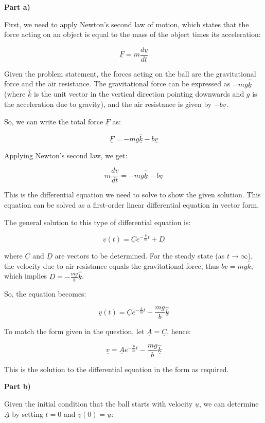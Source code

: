 \textbf{Part a)}

First, we need to apply Newton's second law of motion, which states that the force acting on an object is equal to the mass of the object times its acceleration:

\[ \underline{F} = m\frac{d\underline{v}}{dt} \]

Given the problem statement, the forces acting on the ball are the gravitational force and the air resistance. The gravitational force can be expressed as \( -mg\hat{\underline{k}} \) (where \( \hat{\underline{k}} \) is the unit vector in the vertical direction pointing downwards and \( g \) is the acceleration due to gravity), and the air resistance is given by \( -b\underline{v} \).

So, we can write the total force \( \underline{F} \) as:

\[ \underline{F} = -mg\hat{\underline{k}} - b\underline{v} \]

Applying Newton's second law, we get:

\[ m\frac{d\underline{v}}{dt} = -mg\hat{\underline{k}} - b\underline{v} \]

This is the differential equation we need to solve to show the given solution. This equation can be solved as a first-order linear differential equation in vector form.

The general solution to this type of differential equation is:

\[ \underline{v}(t) = \underline{C}e^{-\frac{b}{m}t} + \underline{D} \]

where \( \underline{C} \) and \( \underline{D} \) are vectors to be determined. For the steady state (as \( t \rightarrow \infty \)), the velocity due to air resistance equals the gravitational force, thus \( b\underline{v} = mg\hat{\underline{k}} \), which implies \( \underline{D} = -\frac{mg}{b}\hat{\underline{k}} \).

So, the equation becomes:

\[ \underline{v}(t) = \underline{C}e^{-\frac{b}{m}t} - \frac{mg}{b}\hat{\underline{k}} \]

To match the form given in the question, let \( \underline{A} = \underline{C} \), hence:

\[ \underline{v} = \underline{A}e^{-\frac{b}{m}t} - \frac{mg}{b}\hat{\underline{k}} \]

This is the solution to the differential equation in the form as required.

\textbf{Part b)}

Given the initial condition that the ball starts with velocity \( \underline{u} \), we can determine \( \underline{A} \) by setting \( t = 0 \) and \( \underline{v}(0) = \underline{u} \):

